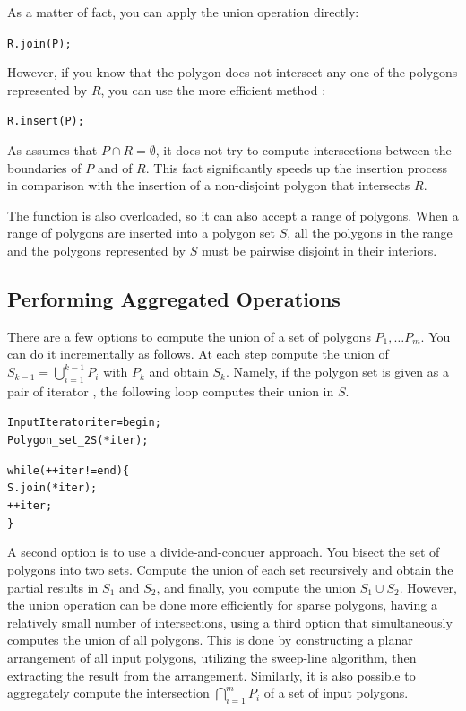 As a matter of fact, you can apply the union operation directly:
\begin{alltt}
  R.join (P);
\end{alltt}

However, if you know that the polygon does not intersect any one of the
polygons represented by $R$, you can use the more efficient method
:
\begin{alltt}
  R.insert (P);
\end{alltt}

As  assumes that $P \cap R = \emptyset$, it does not try to
compute intersections between the boundaries of $P$ and of $R$. This
fact significantly speeds up the insertion process in comparison with the
insertion of a non-disjoint polygon that intersects $R$.

The  function is also overloaded, so it can also accept a
range of polygons. When a range of polygons are inserted into a
polygon set $S$, all the polygons in the range and the polygons represented 
by $S$ must be pairwise disjoint in their interiors.

\subsection{Performing Aggregated Operations}
\label{bso_ssec:agg_ops}

There are a few options to compute the union of a set of polygons
$P_1, \ldots P_m$. You can do it incrementally as follows. At each step
compute the union of $S_{k-1} = \bigcup_{i=1}^{k-1}{P_i}$ 
with $P_{k}$ and obtain $S_k$. Namely, if the polygon set is given
as a pair of iterator \ccc{[begin, end)}, the following loop computes
their union in $S$.
\begin{alltt}
  InputIterator iter = begin;
  Polygon_set_2 S (*iter);

  while (++iter != end) \{
    S.join (*iter);
    ++iter;
  \}
\end{alltt}  
A second option is to use a divide-and-conquer approach. You bisect
the set of polygons into two sets. Compute the union of each set
recursively and obtain the partial results in $S_1$ and $S_2$, and
finally, you compute the union $S_1 \cup S_2$. However, the union
operation can be done more efficiently for sparse polygons, having
a relatively small number of intersections, using a third option that
simultaneously computes the union of all polygons. This is done by 
constructing a planar arrangement of all input polygons, utilizing the
sweep-line algorithm, then extracting the result from the
arrangement. Similarly, it is also possible to aggregately compute the
intersection $\bigcap_{i=1}^{m}{P_i}$ of a set of input polygons.

